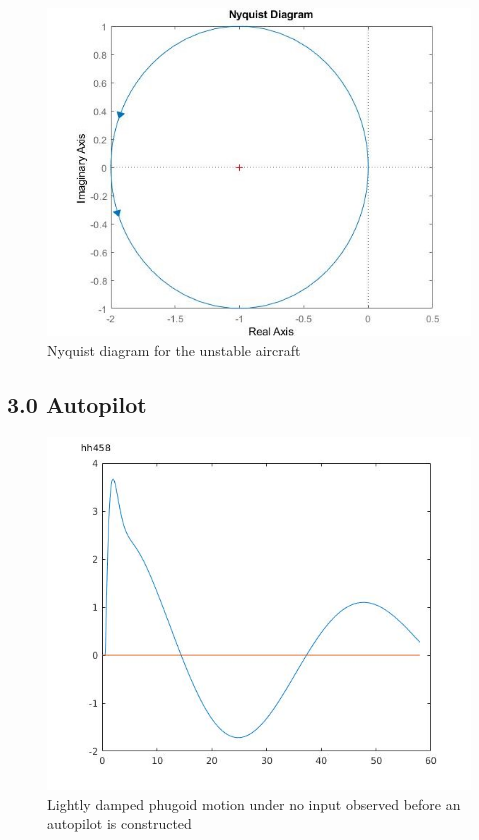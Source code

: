 \documentclass[twoside,twocolumn]{article}
\begin{document}
\begin{figure}[h]
  \centering
    \includegraphics[width=\linewidth]{2-3_nyquist}
  \caption{Nyquist diagram for the unstable aircraft}
  \label{fig:2-3nyquist}
\end{figure}
\subsection{3.0 Autopilot}
\begin{figure}[h]
  \centering
    \includegraphics[width=\linewidth]{3_min_wait}
  \caption{Lightly damped phugoid motion under no input observed before an autopilot is constructed }
  \label{fig:3phugoid}
\end{figure}
\end{document}
